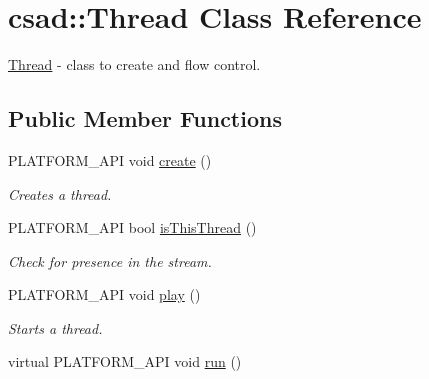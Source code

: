 \hypertarget{classcsad_1_1_thread}{\section{csad\-:\-:Thread Class Reference}
\label{classcsad_1_1_thread}
}


\hyperlink{classcsad_1_1_thread}{Thread} -\/ class to create and flow control.  


\subsection*{Public Member Functions}
\begin{DoxyCompactItemize}
\item 
\hypertarget{classcsad_1_1_thread_a9d1d8f17253e4e3301cad22b90cd4c80}{P\-L\-A\-T\-F\-O\-R\-M\-\_\-\-A\-P\-I void \hyperlink{classcsad_1_1_thread_a9d1d8f17253e4e3301cad22b90cd4c80}{create} ()}\label{classcsad_1_1_thread_a9d1d8f17253e4e3301cad22b90cd4c80}

\begin{DoxyCompactList}\small\item\em Creates a thread. \end{DoxyCompactList}\item 
\hypertarget{classcsad_1_1_thread_a3859f4d76e07b2d54c39247b84467975}{P\-L\-A\-T\-F\-O\-R\-M\-\_\-\-A\-P\-I bool \hyperlink{classcsad_1_1_thread_a3859f4d76e07b2d54c39247b84467975}{is\-This\-Thread} ()}\label{classcsad_1_1_thread_a3859f4d76e07b2d54c39247b84467975}

\begin{DoxyCompactList}\small\item\em Check for presence in the stream. \end{DoxyCompactList}\item 
\hypertarget{classcsad_1_1_thread_a33c0616fea07ea23c7e65e32125e1d6a}{P\-L\-A\-T\-F\-O\-R\-M\-\_\-\-A\-P\-I void \hyperlink{classcsad_1_1_thread_a33c0616fea07ea23c7e65e32125e1d6a}{play} ()}\label{classcsad_1_1_thread_a33c0616fea07ea23c7e65e32125e1d6a}

\begin{DoxyCompactList}\small\item\em Starts a thread. \end{DoxyCompactList}\item 
\hypertarget{classcsad_1_1_thread_aa01e55b7aa0e363a7e7a9bbce106bfd8}{virtual P\-L\-A\-T\-F\-O\-R\-M\-\_\-\-A\-P\-I void \hyperlink{classcsad_1_1_thread_aa01e55b7aa0e363a7e7a9bbce106bfd8}{run} ()}\label{classcsad_1_1_thread_aa01e55b7aa0e363a7e7a9bbce106bfd8}


\end{DoxyCompactItemize}
